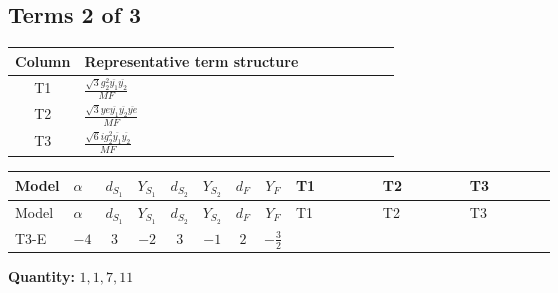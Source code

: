 \documentclass[8pt]{article}
\begin{document}
\begin{landscape}
\subsection*{Terms 2 of 3}
\begin{center}
\begin{tabular}{@{}c >{\raggedright\arraybackslash}p{0.82\linewidth}@{}}
\toprule
Column & Representative term structure \\
\midrule
T1 & \(\displaystyle \frac{\sqrt{3} g_{2}^{2} \overline{y_{1}} \overline{y_{2}}}{MF}\) \\
\midrule
T2 & \(\displaystyle \frac{\sqrt{3} ye \overline{y_{1}} \overline{y_{2}} \overline{ye}}{MF}\) \\
\midrule
T3 & \(\displaystyle \frac{\sqrt{6} i g_{2}^{2} \overline{y_{1}} \overline{y_{2}}}{MF}\) \\
\midrule
\bottomrule
\end{tabular}
\end{center}
\smallskip
\tiny
\begin{longtable}{@{}llcccccc >{\raggedright\arraybackslash}p{0.21\linewidth} >{\raggedright\arraybackslash}p{0.21\linewidth} >{\raggedright\arraybackslash}p{0.21\linewidth}@{}}
\toprule
Model & $\alpha$ & $d_{S_1}$ & $Y_{S_1}$ & $d_{S_2}$ & $Y_{S_2}$ & $d_F$ & $Y_F$ & T1 & T2 & T3 \\
\midrule
\endfirsthead
\toprule
Model & $\alpha$ & $d_{S_1}$ & $Y_{S_1}$ & $d_{S_2}$ & $Y_{S_2}$ & $d_F$ & $Y_F$ & T1 & T2 & T3 \\
\midrule
\endhead
T3-E & $-4$ & $3$ & $-2$ & $3$ & $-1$ & $2$ & $-\frac{3}{2}$ & \scriptsize\adjustbox{max width=\linewidth}{$\begin{gathered} \frac{49 \sqrt{3} g_{2}^{2} \overline{y_{1}} \overline{y_{2}}}{24 MF}\end{gathered}$} & \scriptsize\adjustbox{max width=\linewidth}{$\begin{gathered} - \frac{\sqrt{3} ye \overline{y_{1}} \overline{y_{2}} \overline{ye}}{12 MF}\end{gathered}$} & \scriptsize\adjustbox{max width=\linewidth}{$\begin{gathered} \frac{\sqrt{6} i g_{2}^{2} \overline{y_{1}} \overline{y_{2}}}{3 MF}\end{gathered}$} \\
\midrule
\bottomrule
\end{longtable}
\clearpage
\noindent\textbf{Quantity: }$\mathrm{1,1,7,11}$\par\smallskip

\end{landscape}
\end{document}
